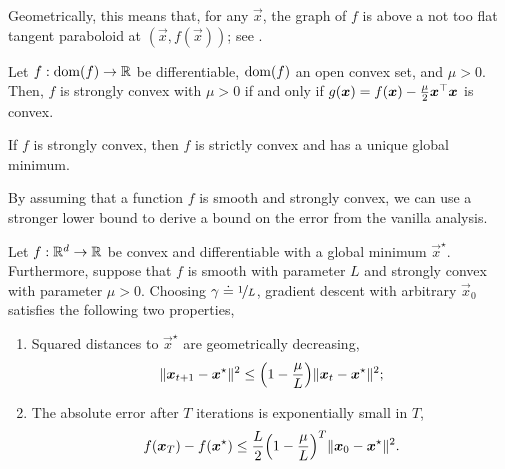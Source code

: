 Geometrically, this means that, for any $\vec{x}$, the graph of $f$ is above a not too flat tangent
paraboloid at $(\vec{x},f(\vec{x}))$; see .

\begin{lemma}
    Let $f: \mathrm{dom}(f) \to \mathbb{R}$ be differentiable, $\mathrm{dom}(f)$ an open convex set, and $\mu > 0$. Then, $f$
    is strongly convex with $\mu > 0$ if and only if $g(\bm{x}) = f(\bm{x}) - \frac{\mu}{2}
        \bm{x}^\top \bm{x}$ is convex.
\end{lemma}

\begin{lemma}
    If $f$ is strongly convex, then $f$ is strictly convex and has a unique global minimum.
\end{lemma}

By assuming that a function $f$ is smooth and strongly convex, we can use a stronger lower bound to
derive a bound on the error from the vanilla analysis.

\begin{theorem}
    Let $f: \mathbb{R}^d \to \mathbb{R}$ be convex and differentiable with a global minimum $\vec{x}^\star$.
    Furthermore, suppose that $f$ is smooth with parameter $L$ and strongly convex with parameter
    $\mu > 0$. Choosing $\gamma \doteq \nicefrac{1}{L}$, gradient descent with arbitrary $\vec{x}_0$
    satisfies the following two properties,
    \begin{enumerate}
        \item Squared distances to $\vec{x}^\star$ are geometrically decreasing, \[
                  \|\vec{x}_{t+1} - \vec{x}^\star\|^2 \leq \lft( 1-\frac{\mu}{L} \rgt) \|\vec{x}_t-\vec{x}^\star\|^2;
              \]
        \item The absolute error after $T$ iterations is exponentially small in $T$, \[
                  f(\vec{x}_T) - f(\vec{x}^\star) \leq \frac{L}{2} \lft( 1-\frac{\mu}{L} \rgt)^T \|\vec{x}_0 - \vec{x}^\star\|^2.
              \]
    \end{enumerate}
\end{theorem}

